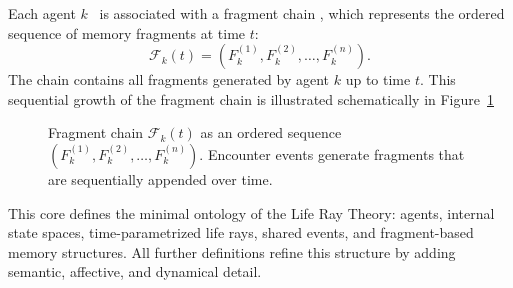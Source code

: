 \documentclass[12pt,a4paper]{article}
\begin{document}
Each agent $k$~ is associated with a fragment chain
,
which represents the ordered sequence of memory fragments at time $t$:
\begin{equation}
  \mathcal{F}_k(t) = (F_k^{(1)}, F_k^{(2)}, \dots, F_k^{(n)}).
  \label{eq:fragment-chain}
\end{equation}
The chain contains all fragments generated by agent $k$ up to time $t$.
This sequential growth of the fragment chain is illustrated schematically in Figure~\ref{fig:fragment-chain}

\begin{figure}[h]
\centering
{}

\caption{Fragment chain $\mathcal{F}_k(t)$ as an ordered sequence
$(F_k^{(1)}, F_k^{(2)}, \dots, F_k^{(n)})$.
Encounter events generate fragments that are sequentially appended over time.}
\label{fig:fragment-chain}
\end{figure}

This core defines the minimal ontology of the Life Ray Theory: agents, internal state spaces,
time-parametrized life rays, shared events, and fragment-based memory structures.
All further definitions refine this structure by adding semantic, affective, and dynamical detail.
\end{document}
